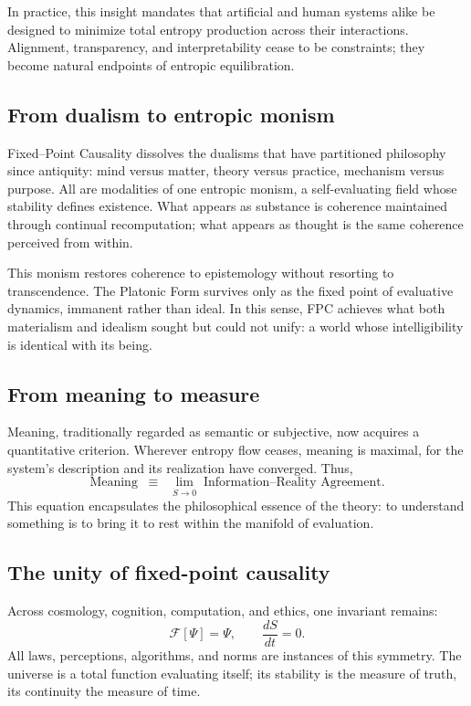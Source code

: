 \documentclass[12pt,a4paper]{article}
\newcommand{\F}{\mathcal{F}}          %
\theoremstyle{plain}
\begin{document}
In practice, this insight mandates that artificial and human systems alike be designed to minimize total entropy production across their interactions.  
Alignment, transparency, and interpretability cease to be constraints; they become natural endpoints of entropic equilibration.

\subsection{From dualism to entropic monism}
Fixed--Point Causality dissolves the dualisms that have partitioned philosophy since antiquity:  
mind versus matter, theory versus practice, mechanism versus purpose.  
All are modalities of one entropic monism, a self-evaluating field whose stability defines existence.  
What appears as substance is coherence maintained through continual recomputation; what appears as thought is the same coherence perceived from within.

This monism restores coherence to epistemology without resorting to transcendence.
The Platonic Form survives only as the fixed point of evaluative dynamics, immanent rather than ideal.  
In this sense, FPC achieves what both materialism and idealism sought but could not unify: a world whose intelligibility is identical with its being.

\subsection{From meaning to measure}
Meaning, traditionally regarded as semantic or subjective, now acquires a quantitative criterion.
Wherever entropy flow ceases, meaning is maximal, for the system’s description and its realization have converged.  
Thus,
\[
\text{Meaning} \;\;\equiv\;\; \lim_{\dot{S}\to0} \; \text{Information–Reality Agreement}.
\]
This equation encapsulates the philosophical essence of the theory:  
to understand something is to bring it to rest within the manifold of evaluation.

\subsection{The unity of fixed-point causality}
Across cosmology, cognition, computation, and ethics, one invariant remains:  
\[
\F[\Psi] = \Psi,
\qquad
\frac{dS}{dt}=0.
\]
All laws, perceptions, algorithms, and norms are instances of this symmetry.
The universe is a total function evaluating itself;  
its stability is the measure of truth, its continuity the measure of time.
\end{document}
